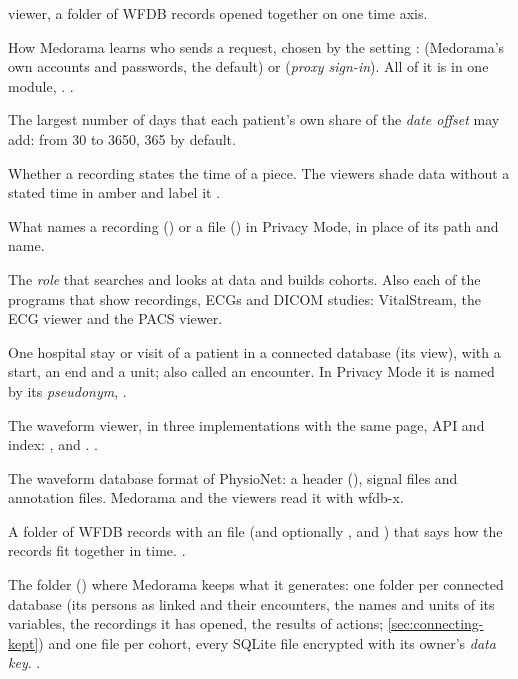 \begin{description}
  viewer, a folder of WFDB records opened together on one time axis.
\item[Sign-in method] How Medorama learns who sends a request, chosen by the setting
  :  (Medorama's own accounts and passwords, the default) or
   (\textit{proxy sign-in}). All of it is in one module,
  . .
\item[spread\_days] The largest number of days that each patient's own share of the
  \textit{date offset} may add: from 30 to 3650, 365 by default.
\item[Timed] Whether a recording states the time of a piece. The viewers shade data without a
  stated time in amber and label it .
\item[Token] What names a recording () or a file () in Privacy
  Mode, in place of its path and name.
\item[Viewer] The \textit{role} that searches and looks at data and builds cohorts. Also each of
  the programs that show recordings, ECGs and DICOM studies: VitalStream, the ECG viewer and the
  PACS viewer.
\item[Visit] One hospital stay or visit of a patient in a connected database (its
   view), with a start, an end and a unit; also called an encounter. In Privacy
  Mode it is named by its \textit{pseudonym}, .
\item[VitalStream] The waveform viewer, in three implementations with the same page, API and
  index: ,  and .
  .
\item[WFDB] The waveform database format of PhysioNet: a header (), signal files and
  annotation files. Medorama and the viewers read it with wfdb-x.
\item[WFDB collection] A folder of WFDB records with an  file (and optionally
  ,  and ) that says how the records fit together
  in time. .
\item[Workspace] The folder () where Medorama keeps what it generates: one
  folder per connected database (its persons as linked and their encounters, the names and
  units of its variables, the recordings it has opened, the results of actions;
  \cref{sec:connecting-kept}) and one file per cohort, every SQLite file encrypted with its owner's
  \textit{data key}. .
\end{description}
